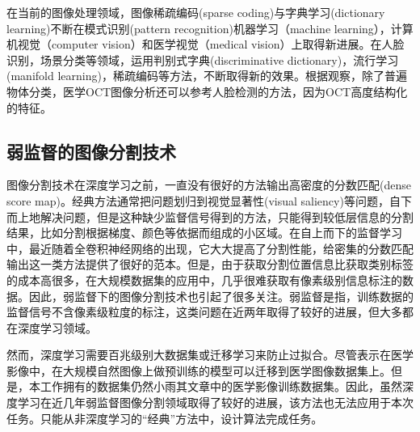     在当前的图像处理领域，图像稀疏编码(sparse coding)与字典学习(dictionary learning)不断在模式识别(pattern recognition)机器学习（machine learning），计算机视觉（computer vision）和医学视觉（medical vision）上取得新进展。在人脸识别\cite{zhang2010discriminative,wright2009robust}，场景分类\cite{lazebnik2006beyond,gao2010kernel}等领域，运用判别式字典(discriminative dictionary)，流行学习(manifold learning)，稀疏编码等方法，不断取得新的效果。根据观察，除了普遍物体分类，医学OCT图像分析还可以参考人脸检测的方法，因为OCT高度结构化的特征。



    \subsection{弱监督的图像分割技术}
    图像分割技术在深度学习之前，一直没有很好的方法输出高密度的分数匹配(dense score map)。经典方法通常把问题划归到视觉显著性(visual saliency)\cite{han2006unsupervised,donoser2009saliency,yang2008unsupervised,chang2011co}等问题，自下而上地解决问题，但是这种缺少监督信号得到的方法，只能得到较低层信息的分割结果，比如分割根据梯度、颜色等依据而组成的小区域。在自上而下的监督学习中，最近随着全卷积神经网络\cite{long2015fully}的出现，它大大提高了分割性能，给密集的分数匹配输出这一类方法提供了很好的范本。但是，由于获取分割位置信息比获取类别标签的成本高很多，在大规模数据集的应用中，几乎很难获取有像素级别信息标注的数据。因此，弱监督下的图像分割技术也引起了很多关注。弱监督是指，训练数据的监督信号不含像素级粒度的标注，这类问题在近两年取得了较好的进展，但大多都在深度学习领域\cite{hong2015decoupled,pathak2014fully,oquab2015object,wei2016stc,papandreou2015weakly}。

    然而，深度学习需要百兆级别大数据集\cite{}或迁移学习\cite{shin2016deep,wangtransfer}来防止过拟合。尽管表示在医学影像中，在大规模自然图像上做预训练的模型可以迁移到医学图像数据集上。但是，本工作拥有的数据集仍然小雨其文章中的医学影像训练数据集。因此，虽然深度学习在近几年弱监督图像分割领域取得了较好的进展，该方法也无法应用于本次任务。只能从非深度学习的“经典”方法中，设计算法完成任务。





